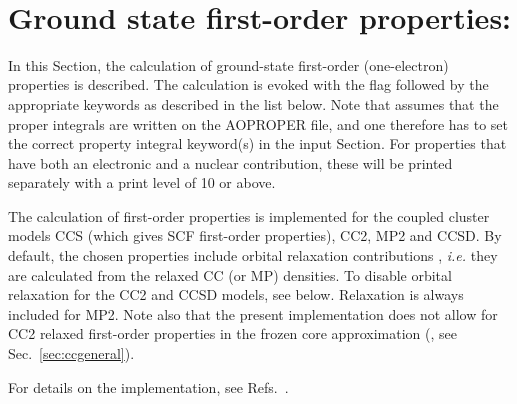 ~%
\section{Ground state first-order properties: }
\label{sec:ccfop}

In this Section, the calculation of ground-state first-order
(one-electron) properties is described. The calculation
is evoked with the  flag followed by the appropriate
keywords as described in the list below. Note that 
assumes that the proper integrals are written on the
AOPROPER file, and one therefore has to set the correct property
integral keyword(s) in the  input Section. For properties
that have both an electronic and a nuclear contribution, these will
be printed separately with a print level of 10 or above.

The calculation of first-order properties is implemented for the 
coupled cluster models CCS (which gives SCF first-order properties),
CC2, MP2 and CCSD.  
By default, the chosen properties include orbital relaxation
contributions ,
{\it i.e.\/} they are calculated from the relaxed CC (or MP) densities. 
To disable orbital relaxation for the CC2 and CCSD models, 
see  below. Relaxation is always included for MP2. 
Note also that the present implementation does not allow for 
CC2 relaxed first-order
properties in the frozen core approximation 
(, see Sec.~\ref{sec:ccgeneral}).

For details on the implementation, see 
Refs.~\cite{Halkier:CCFOP,Halkier:CC2RLXFOP}.

\begin{center}
\end{center}

